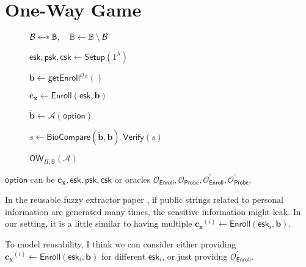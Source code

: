 
\newpage


\section{One-Way Game}

\begin{figure}[h]
\centering

	\begin{minipage}[t]{0.55\textwidth}
	\begin{algorithm}[H]
	\caption{$\textsf{OW}_{\Pi, \mathbb{B}}(\mathcal{A})$}
	\label{alg:ow_game}
	\begin{algorithmic}[1]

		\State $\mathcal{B} \getsdollar \mathbb{B}, \quad \mathbb{B} \gets \mathbb{B} \setminus \mathcal{B}$

		\State $\textsf{esk}, \textsf{psk}, \textsf{csk} \gets \textsf{Setup}(1^\lambda)$

		\State $\mathbf{b} \gets \textsf{getEnroll}^{\mathcal{O}_{\mathcal{B}}}()$

		\State $\mathbf{c_x} \gets \textsf{Enroll}(\textsf{esk}, \mathbf{b})$

		\State $\mathbf{\tilde{b}} \gets \mathcal{A}( \textsf{option} )$

		\State $s \gets \textsf{BioCompare}( \mathbf{\tilde{b}}, \mathbf{b})$
		\State \Return $ \textsf{Verify}(s) $
	\end{algorithmic}
	\end{algorithm}
	\end{minipage}

\label{fig:ow_game}
\end{figure}

\noindent $\textsf{option}$ can be $\mathbf{c_x}, \textsf{esk}, \textsf{psk}, \textsf{csk}$ or oracles $\mathcal{O}_{\textsf{Enroll}}, \mathcal{O}_{\textsf{Probe}}, \mathcal{O}^\prime_{\textsf{Enroll}}, \mathcal{O}^\prime_{\textsf{Probe}}$.

In the reusable fuzzy extractor paper \cite{10.1145/1030083.1030096}, if public strings related to personal information are generated many times, the sensitive information might leak. In our setting, it is a little similar to having multiple $\mathbf{c_x}^{(i)} \gets \textsf{Enroll}(\textsf{esk}_i, \mathbf{b})$.

To model reusability, I think we can consider either providing $\mathbf{c_x}^{(i)} \gets \textsf{Enroll}(\textsf{esk}_i, \mathbf{b})$ for different $\textsf{esk}_i$, or just providng $\mathcal{O}^\prime_{\textsf{Enroll}}$.





